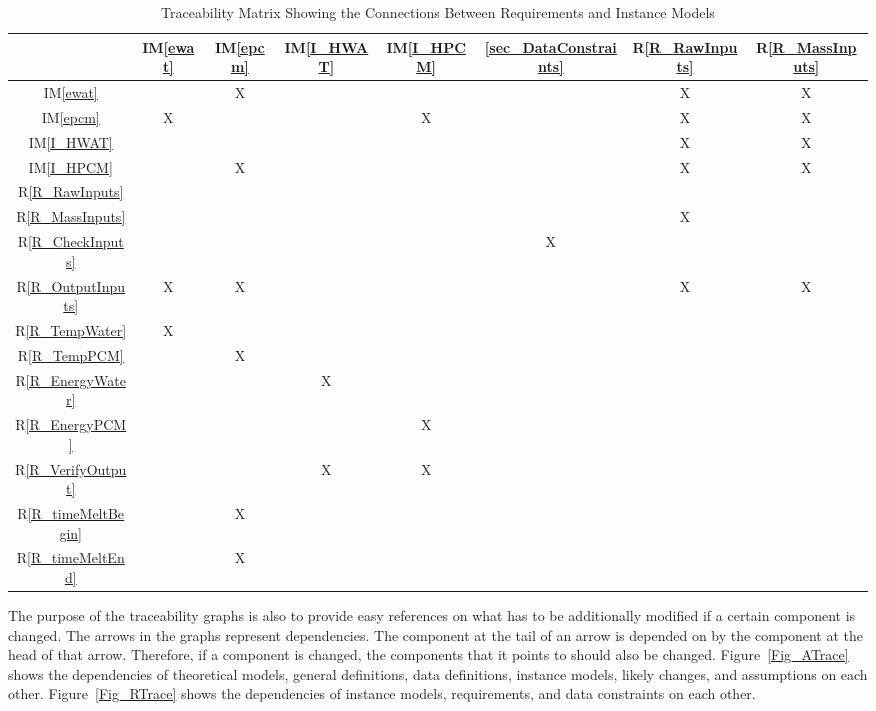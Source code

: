 \documentclass[12pt]{article}
\newcommand{\iref}[1]{IM\ref{#1}}
\newcommand{\rref}[1]{R\ref{#1}}
\begin{document}
\begin{table}[h!]
\centering
\begin{tabular}{|c|c|c|c|c|c|c|c|}
\hline
	& \iref{ewat}& \iref{epcm}& \iref{I_HWAT}& \iref{I_HPCM}& \ref{sec_DataConstraints}& \rref{R_RawInputs}& \rref{R_MassInputs} \\
\hline
\iref{ewat}            & & X& & & & X& X \\ \hline
\iref{epcm}            & X& & & X& & X& X \\ \hline
\iref{I_HWAT}          & & & & & & X& X \\ \hline
\iref{I_HPCM}          & & X& & & & X& X \\ \hline
\rref{R_RawInputs}     & & & & & & & \\ \hline
\rref{R_MassInputs}    & & & & & & X& \\ \hline
\rref{R_CheckInputs}   & & & & & X& & \\ \hline
\rref{R_OutputInputs}  & X& X& & & & X& X \\ \hline
\rref{R_TempWater}     & X& & & & & & \\ \hline 
\rref{R_TempPCM}       & & X& & & & & \\ \hline
\rref{R_EnergyWater}   & & & X& & & & \\ \hline
\rref{R_EnergyPCM}     & & & & X& & & \\ \hline
\rref{R_VerifyOutput}  & & & X& X& & & \\ \hline
\rref{R_timeMeltBegin} & & X& & & & & \\ \hline
\rref{R_timeMeltEnd}   & & X& & & & & \\ 
\hline
\end{tabular}
\caption{Traceability Matrix Showing the Connections Between Requirements and Instance Models}
\label{Table:R_trace}
\end{table}

The purpose of the traceability graphs is also to provide easy references on
what has to be additionally modified if a certain component is changed.  The
arrows in the graphs represent dependencies. The component at the tail of an
arrow is depended on by the component at the head of that arrow. Therefore, if a
component is changed, the components that it points to should also be
changed. Figure~\ref{Fig_ATrace} shows the dependencies of theoretical models,
general definitions, data definitions, instance models, likely changes, and
assumptions on each other. Figure~\ref{Fig_RTrace} shows the dependencies of
instance models, requirements, and data constraints on each other.
\end{document}
